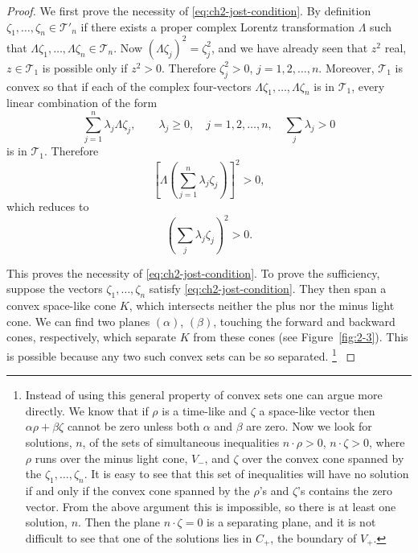 \begin{proof}

We first prove the necessity of \eqref{eq:ch2-jost-condition}.  By definition
$\zeta_1,\ldots,\zeta_n\in\mathcal{T}'_{n}$ if there exists a proper complex
Lorentz transformation $\Lambda$ such that
$\Lambda\zeta_1,\ldots,\Lambda\zeta_n\in\mathcal{T}_{n}$.  Now
$(\Lambda\zeta_j)^2=\zeta_j^2$, and we have already seen that $z^2$ real,
$z\in\mathcal{T}_{1}$ is possible only if $z^2>0$.  Therefore
$\zeta_j^2>0$, $j=1,2,\ldots,n$.  Moreover, $\mathcal{T}_{1}$ is convex so
that if each of the complex four-vectors
$\Lambda\zeta_1,\ldots,\Lambda\zeta_n$ is in $\mathcal{T}_{1}$, every linear
combination of the form
\begin{equation*}
  \sum_{j=1}^{n}\lambda_j\Lambda\zeta_j,
  \qquad \lambda_j\geq0,\quad j=1,2,\ldots,n,\quad
  \sum_j\lambda_j>0
\end{equation*}
is in $\mathcal{T}_{1}$.  Therefore
\begin{equation*}
  \left[\Lambda\left(\sum_{j=1}^{n}\lambda_j\zeta_j\right)\right]^2>0,
\end{equation*}
which reduces to
\begin{equation*}
  \left(\sum_j\lambda_j\zeta_j\right)^2>0 .
\end{equation*}

This proves the necessity of \eqref{eq:ch2-jost-condition}.  To prove the sufficiency, suppose the
vectors $\zeta_1,\ldots,\zeta_n$ satisfy \eqref{eq:ch2-jost-condition}.  They then span a convex
space-like cone $K$, which intersects neither the plus nor the minus light
cone.  We can find two planes $(\alpha)$, $(\beta)$, touching the forward and
backward cones, respectively, which separate $K$ from these cones (see
Figure~\ref{fig:2-3}).  This is possible because any two such convex sets can be so
separated.%
\begingroup
\renewcommand{\thefootnote}{\ensuremath{\dagger}}
\footnote{Instead of using this general property of convex sets one can argue
more directly.  We know that if $\rho$ is a time-like and $\zeta$ a space-like
vector then $\alpha\rho+\beta\zeta$ cannot be zero unless both $\alpha$ and
$\beta$ are zero.  Now we look for solutions, $n$, of the sets of simultaneous
inequalities $n\mathbin{\cdot}\rho>0$, $n\mathbin{\cdot}\zeta>0$, where $\rho$
runs over the minus light cone, $V_{-}$, and $\zeta$ over the convex cone
spanned by the $\zeta_1,\ldots,\zeta_n$.  It is easy to see that this set of
inequalities will have no solution if and only if the convex cone spanned by
the $\rho$'s and $\zeta$'s contains the zero vector.  From the above argument
this is impossible, so there is at least one solution, $n$.  Then the plane
$n\mathbin{\cdot}\zeta=0$ is a separating plane, and it is not difficult to see
that one of the solutions lies in $C_{+}$, the boundary of $V_{+}$.}
\endgroup


\end{proof}
